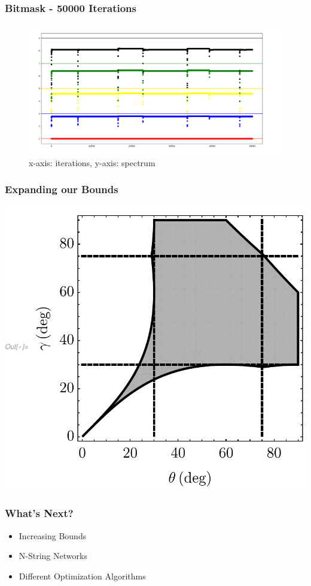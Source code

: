 \documentclass{beamer}
\begin{document}
\begin{frame}
\frametitle{Bitmask - 50000 Iterations}
    \centering
    \begin{figure}
        \centering
        \includegraphics[width=1.1\textwidth,height=2\textheight,keepaspectratio]{Bitmask_50000.png}
        \caption{x-axis: iterations, y-axis: spectrum}
    \end{figure}
\end{frame}
\begin{frame}
\frametitle{Expanding our Bounds}
    \centering
    \includegraphics[width=\textwidth,height=.8\textheight,keepaspectratio]{anglediagram2.pdf}
\end{frame}

\begin{frame}
\frametitle{What's Next?}
\Huge{\begin{itemize}
    \item Increasing Bounds
    \item N-String Networks
    \item Different Optimization Algorithms
\end{itemize}}
\end{frame}
\end{document}
